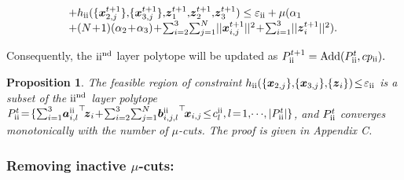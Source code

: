 \documentclass[letterpaper]{article}
\newtheorem{prop}{Proposition}
\begin{document}
\begin{equation}
\begin{array}{l}
\!+h_{{\rm{\uppercase\expandafter{\romannumeral2}}}}(\{{\boldsymbol{x}_{2,j}^{t+1}}\} ,\!\{ {\boldsymbol{x}_{3,j}^{t+1}}\} ,\!{\boldsymbol{z}_1^{t+1}}{\rm{,}}{\boldsymbol{z}_2^{t+1}},\!{\boldsymbol{z}_3^{t+1}})
\le \varepsilon_{\rm{\uppercase\expandafter{\romannumeral2}}}  + \mu (\alpha_1 \\
\!+ (N\!+\!1)(\alpha_2\!+\!\alpha_3) \!+\! \sum\nolimits_{i = 2}^3 \! \sum\nolimits_{j = 1}^N \!||\boldsymbol{x}_{i,j}^{t+1}||^2 \!+\! \sum\nolimits_{i = 1}^3 \!||\boldsymbol{z}_i^{t+1}||^2 ).
\end{array}
\end{equation}

Consequently, the ${\rm{\uppercase\expandafter{\romannumeral2}}}^{\rm{nd}}$ layer polytope will be updated as
$ {P_{{\rm{\uppercase\expandafter{\romannumeral2}}}}^{t + 1}} = {\rm{Add}}({P_{{\rm{\uppercase\expandafter{\romannumeral2}}}}^{t}},{cp_{\rm{\uppercase\expandafter{\romannumeral2}}}}).$



\begin{prop}
\label{prop:2}
The feasible region of constraint $h_{{\rm{\uppercase\expandafter{\romannumeral2}}}}(\{{\boldsymbol{x}_{2,j}}\} ,\!\{ {\boldsymbol{x}_{3,j}}\} ,\!\{{\boldsymbol{z}_i}\})\! \le \! \varepsilon_{\rm{\uppercase\expandafter{\romannumeral2}}}$  is a subset of the ${\rm{\uppercase\expandafter{\romannumeral2}}}^{\rm{nd}}$ layer polytope  $P_{\rm{\uppercase\expandafter{\romannumeral2}}}^{t}\!=\!\{\sum\nolimits_{i = 1}^3 \!{\boldsymbol{a}_{i,l}^{{\rm{\uppercase\expandafter{\romannumeral2}}}}} ^{\top}\!{\boldsymbol{z}_i} \!+\! \sum\nolimits_{i = 2}^3 \!{\sum\nolimits_{j = 1}^N \!{\boldsymbol{b}{{_{i,j,l}^{{\rm{\uppercase\expandafter{\romannumeral2}}}}}}}^{\top}\!{\boldsymbol{x}_{i,j}} }  \!\le\! c_l^{{\rm{\uppercase\expandafter{\romannumeral2}}}},l \!=\! 1,\! \cdots \!,|P_{{\rm{\uppercase\expandafter{\romannumeral2}}}}^{t}| \}$, and  $P_{\rm{\uppercase\expandafter{\romannumeral2}}}^{t}$ converges monotonically with the number of $\mu$-cuts. The proof is given in Appendix C.
\end{prop}


\subsubsection{Removing inactive $\mu$-cuts:}
\end{document}
